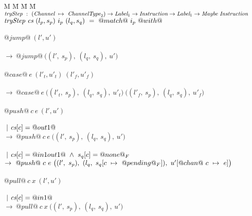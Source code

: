 

\newcommand\nextStep[5]{\big((#1,~#2),~(#3,~#4),~#5 \big)}


\begin{figure*}
\begin{tabbing}
M \= M \= M \= M \kill
$\textit{tryStep} ~:~ (\textit{Channel} ~\mapsto~ \textit{ChannelType}_2) \to \textit{Label}_1 \to \textit{Instruction} \to \textit{Label}_1 \to \textit{Maybe}~\textit{Instruction}$ \\
$\textit{tryStep} ~\textit{cs}~(l_p,s_p)~i_p~(l_q,s_q)~=~@match@~i_p~@with@$ \\

\\
\> $@jump@~(l',u')$ \\
\> \>  \\
\> \> $\to~@jump@~
      \nextStep
        {l'}{s_p}
        {l_q}{s_q}
        {u'}
      $ \\

\\


\> $@case@~e~(l'_t,u'_t)~(l'_f,u'_f)$ \\
\> \>  \\
\> \> $\to~@case@~e~
      \nextStep
        {l'_t}{s_p}
        {l_q}{s_q}
        {u'_t}
      ~
      \nextStep
        {l'_f}{s_p}
        {l_q}{s_q}
        {u'_f}
      $ \\

\\

\> $@push@~c~e~(l',u')$ \\
\> \> \\
\> \> $~|~\textit{cs}[c]=@out1@$ \\
\> \> $\to~@push@~c~e~
      \nextStep
        {l'}
          {s_p}
        {l_q}
          {s_q}
        {u'}
      $ \\

\> \> \\
\> \> $~|~\textit{cs}[c]=@in1out1@ ~\wedge~ s_q[c]=@none@_F$ \\
\> \> $\to~@push@~c~e~
      \nextStep
        {l'}
          {s_p}
        {l_q}
          {\HeapUpdateOne{c}{@pending@_F}{s_q}}
        {\HeapUpdateOne{@chan@~c}{e}{u'}}
      $ \\

\\

\> $@pull@~c~x~(l',u')$ \\
\> \> \\
\> \> $~|~\textit{cs}[c]=@in1@$ \\
\> \> $\to~@pull@~c~x~
      \nextStep
        {l'}{s_p}
        {l_q}{s_q}
        {u'}
    $ \\


\end{tabbing}
\end{figure*}
